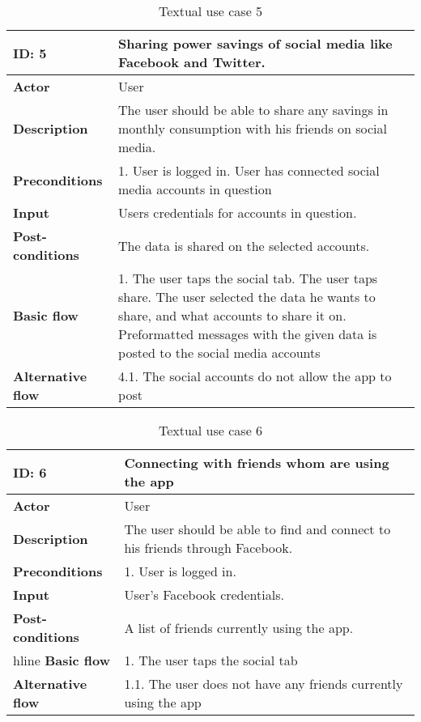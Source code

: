 \begin{table}[H]
\begin{tabular}{|l|p{11.7cm}|}
\hline
\textbf{ID: }5&\textbf{Sharing power savings of social media like Facebook and Twitter.}
\\\hline
\textbf{Actor} &User
\\\hline
\textbf{Description}&
The user should be able to share any savings in monthly consumption with his friends on social media.\\\hline
\textbf{Preconditions}&
1. User is logged in\newline
2. User has connected social media accounts in question\\\hline
\textbf{Input}&
Users credentials for accounts in question.\\\hline
\textbf{Post-conditions}& 
The data is shared on the selected accounts. \\\hline
\textbf{Basic flow}&
1. The user taps the social tab\newline
2. The user taps share\newline
3. The user selected the data he wants to share, and what accounts to share it on\newline
4. Preformatted messages with the given data is posted to the social media accounts
\\\hline
\textbf{Alternative flow}&
4.1. The social accounts do not allow the app to post
\\\hline
\end{tabular}
\caption{Textual use case 5}
\end{table}

\begin{table}[H]
\begin{tabular}{|l|p{11.7cm}|}
\hline
\textbf{ID: }6&\textbf{Connecting with friends whom are using the app}
\\\hline
\textbf{Actor} &User
\\\hline
\textbf{Description}&
The user should be able to find and connect to his friends through Facebook.\\\hline
\textbf{Preconditions}&
1. User is logged in.\\\hline
\textbf{Input}&
User's Facebook credentials.\\\hline
\textbf{Post-conditions}& 
A list of friends currently using the app.\\hline
\textbf{Basic flow}&
1. The user taps the social tab
\\\hline
\textbf{Alternative flow}&
1.1. The user does not have any friends currently using the app
\\\hline
\end{tabular}
\caption{Textual use case 6}
\end{table}


